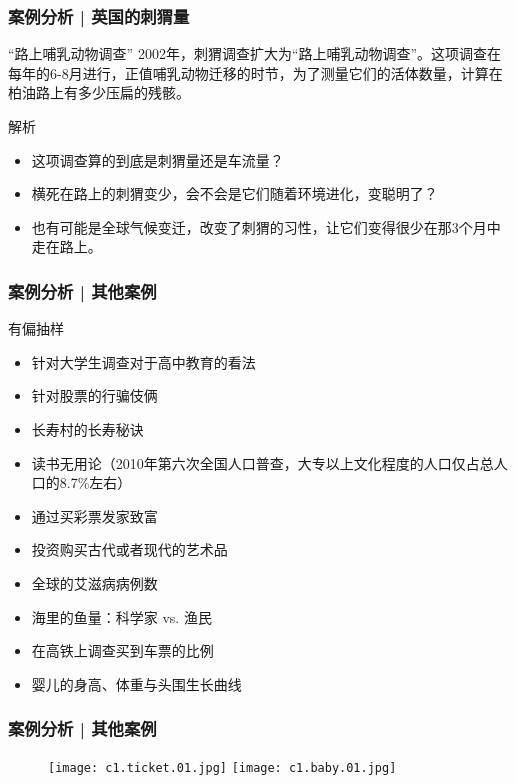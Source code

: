 \begin{frame}
  \frametitle{案例分析 | 英国的刺猬量}
  \begin{block}{“路上哺乳动物调查”}
    2002年，刺猬调查扩大为“路上哺乳动物调查”。这项调查在每年的6-8月进行，正值哺乳动物迁移的时节，为了测量它们的活体数量，计算在柏油路上有多少压扁的残骸。
  \end{block}
  \pause \pause \pause \pause
  \begin{block}{解析}
    \begin{itemize}
      \item 这项调查算的到底是刺猬量还是车流量？
      \item 横死在路上的刺猬变少，会不会是它们随着环境进化，变聪明了？
      \item 也有可能是全球气候变迁，改变了刺猬的习性，让它们变得很少在那3个月中走在路上。
    \end{itemize}
  \end{block}
\end{frame}

\begin{frame}
  \frametitle{案例分析 | 其他案例}
  \begin{block}{有偏抽样}
    \begin{itemize}
      \item 针对大学生调查对于高中教育的看法
      \item 针对股票的行骗伎俩
      \item 长寿村的长寿秘诀
      \item 读书无用论（2010年第六次全国人口普查，大专以上文化程度的人口仅占总人口的8.7\%左右）
      \item 通过买彩票发家致富
      \item 投资购买古代或者现代的艺术品
      \item 全球的艾滋病病例数
      \item 海里的鱼量：科学家 vs. 渔民
      \item 在高铁上调查买到车票的比例
      \item 婴儿的身高、体重与头围生长曲线
    \end{itemize}
  \end{block}
\end{frame}

\begin{frame}
  \frametitle{案例分析 | 其他案例}
    \begin{figure}
      \centering
      \texttt{[image: c1.ticket.01.jpg]}\quad
      \texttt{[image: c1.baby.01.jpg]}
    \end{figure}
\end{frame}

